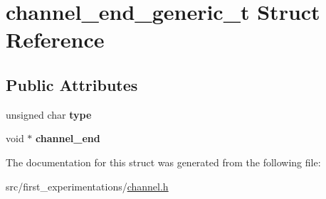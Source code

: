 \hypertarget{structchannel__end__generic__t}{\section{channel\-\_\-end\-\_\-generic\-\_\-t Struct Reference}
\label{structchannel__end__generic__t}
}
\subsection*{Public Attributes}
\begin{DoxyCompactItemize}
\item 
\hypertarget{structchannel__end__generic__t_a0f1124e61811509f41d974b1df7a3bfc}{unsigned char {\bfseries type}}\label{structchannel__end__generic__t_a0f1124e61811509f41d974b1df7a3bfc}

\item 
\hypertarget{structchannel__end__generic__t_aef84ec65d166ccf7a193fa19bcb052a1}{void $\ast$ {\bfseries channel\-\_\-end}}\label{structchannel__end__generic__t_aef84ec65d166ccf7a193fa19bcb052a1}

\end{DoxyCompactItemize}


The documentation for this struct was generated from the following file\-:\begin{DoxyCompactItemize}
\item 
src/first\-\_\-experimentations/\hyperlink{channel_8h}{channel.\-h}\end{DoxyCompactItemize}
